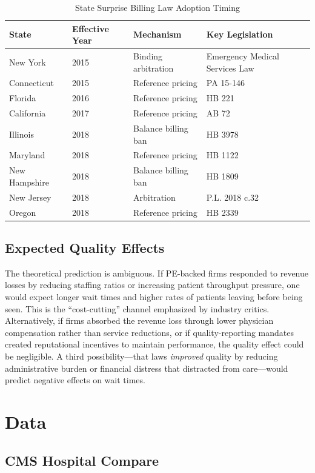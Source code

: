 \documentclass[12pt]{article}
\begin{document}
\begin{table}[htbp]
\centering
\caption{State Surprise Billing Law Adoption Timing}
\label{tab:timing}
\begin{tabular}{llll}
\hline\hline
State & Effective Year & Mechanism & Key Legislation \\
\hline
New York & 2015 & Binding arbitration & Emergency Medical Services Law \\
Connecticut & 2015 & Reference pricing & PA 15-146 \\
Florida & 2016 & Reference pricing & HB 221 \\
California & 2017 & Reference pricing & AB 72 \\
Illinois & 2018 & Balance billing ban & HB 3978 \\
Maryland & 2018 & Reference pricing & HB 1122 \\
New Hampshire & 2018 & Balance billing ban & HB 1809 \\
New Jersey & 2018 & Arbitration & P.L. 2018 c.32 \\
Oregon & 2018 & Reference pricing & HB 2339 \\
\hline\hline
\end{tabular}
\end{table}

\subsection{Expected Quality Effects}

The theoretical prediction is ambiguous. If PE-backed firms responded to revenue losses by reducing staffing ratios or increasing patient throughput pressure, one would expect longer wait times and higher rates of patients leaving before being seen. This is the ``cost-cutting'' channel emphasized by industry critics. Alternatively, if firms absorbed the revenue loss through lower physician compensation rather than service reductions, or if quality-reporting mandates created reputational incentives to maintain performance, the quality effect could be negligible. A third possibility---that laws \emph{improved} quality by reducing administrative burden or financial distress that distracted from care---would predict negative effects on wait times.


\section{Data}
\label{sec:data}

\subsection{CMS Hospital Compare}
\end{document}
